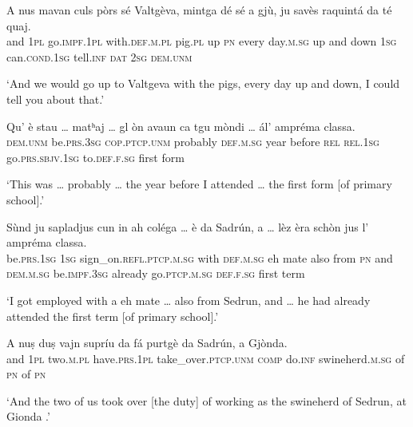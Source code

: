\begin{linenumbers}
\gll    A nus mavan culs pòrs sé Valtgèva, mintga dé sé a gjù, ju savès raquintá da té quaj.\\
and \textsc{1pl}  go.\textsc{impf.1pl} with.\textsc{def.m.pl} pig.\textsc{pl} up \textsc{pn} every day.\textsc{m.sg} up and down  \textsc{1sg}  can.\textsc{cond.1sg}  tell.\textsc{inf}  \textsc{dat}  \textsc{2sg} \textsc{dem.unm}\\
\end{linenumbers}
\medskip
\glt `And we would go up to Valtgeva with the pigs, every day up and down, I could tell you about that.'
\medskip

\begin{linenumbers}
\gll    Qu’ è stau … matʰaj … gl òn avaun ca tgu mòndi … ál’ ampréma classa.\\
 \textsc{dem.unm} be.\textsc{prs.3sg} \textsc{cop.ptcp.unm} {} probably {} \textsc{def.m.sg} year before \textsc{rel} \textsc{rel.1sg} go.\textsc{prs.sbjv.1sg} {}   to.\textsc{def.f.sg} first form\\
\end{linenumbers}
\medskip
\glt `This was … probably … the year before I attended … the first form [of primary school].'
\medskip

\begin{linenumbers}
\gll    Sùnd ju sapladjus cun in ah coléga … è da Sadrún, a … lèz èra schòn jus l’ ampréma classa.\\
 be.\textsc{prs.1sg} \textsc{1sg} sign\_on.\textsc{refl.ptcp.m.sg} with \textsc{def.m.sg} eh mate {} also from \textsc{pn} and {} \textsc{dem.m.sg}  be.\textsc{impf.3sg} already go.\textsc{ptcp.m.sg} \textsc{def.f.sg} first term\\
\end{linenumbers}
\medskip
\glt `I got employed with a eh mate … also from Sedrun, and … he had already attended the first term [of primary school].'
\medskip

\begin{linenumbers}
	\gll    A nuṣ duṣ vajn supríu da fá purtgè da Sadrún, a Gjònda.\\
	and \textsc{1pl} two.\textsc{m.pl} have.\textsc{prs.1pl} take\_over.\textsc{ptcp.unm}  \textsc{comp} do.\textsc{inf}  swineherd.\textsc{m.sg} of  \textsc{pn} of \textsc{pn}\\
\end{linenumbers}
\medskip
\glt `And the two of us took over [the duty] of working as the swineherd of Sedrun, at Gionda .'
\medskip

